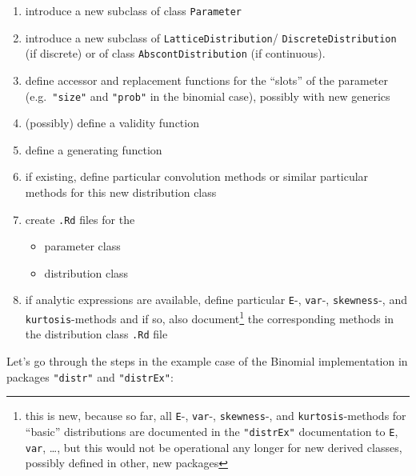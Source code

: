 \documentclass[10pt]{article}
\let\code\lstinline
\def\pkg#1{{\tt "#1"}}
\begin{document}
\begin{enumerate}
\item introduce a  new subclass of  class \code{Parameter}
\item introduce a new subclass of  \code{LatticeDistribution}/%
\code{DiscreteDistribution} (if discrete)
 or of class \code{AbscontDistribution} (if continuous).
\item define accessor and replacement functions for the ``slots'' of the
parameter (e.g.\ \code{"size"} and \code{"prob"} in the binomial case), 
possibly with new generics
\item (possibly) define a validity function
\item define a generating function
\item if existing, define particular convolution methods or similar particular
methods for this new distribution class
\item create {\tt .Rd} files for the
\begin{itemize}
      \item parameter class
      \item distribution class
\end{itemize}
\item if analytic expressions are available, define particular \code{E}-, \code{var}-, 
\code{skewness}-, and \code{kurtosis}-methods
     and if so, also document\footnote{%
%
this is new, because so far, all \code{E}-, \code{var}-, 
\code{skewness}-, and \code{kurtosis}-methods for ``basic'' 
distributions are documented in the \pkg{distrEx} documentation to 
\code{E}, \code{var}, \ldots, but this would not be operational
any longer for new derived classes, possibly defined in other, new packages
%
     } the corresponding methods in
     the distribution class {\tt .Rd} file\\
\end{enumerate}
    
Let's go through the steps in the example case of the Binomial implementation
in packages \pkg{distr} and \pkg{distrEx}:
\end{document}
